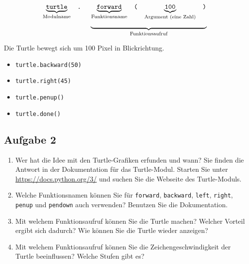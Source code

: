 $$
\begin{array}[t]{ccc} 
\underbrace{\textrm{\texttt{turtle}}}_{\textrm{Modulname}} & \texttt{.} & 
\begin{array}[t]{cccc} 
\underbrace{\textrm{\texttt{forward}}}_{\textrm{Funktionsname}} & \texttt{(} &\underbrace{\textrm{\texttt{100}}}_{\textrm{Argument (eine Zahl)}} & \texttt{)} \end{array} \\
 &  & \underbrace{\hspace{6cm}}_{\textrm{Funktionsaufruf}}
\end{array}
$$
\begin{center}
Die Turtle bewegt sich um \num{100} Pixel in Blickrichtung.
\end{center}
\vspace{0.5cm}
\begin{itemize}
	\centering
	\item[] \lstinline{turtle.backward(50)}
	\vspace{2.25cm}
	\item[] \lstinline{turtle.right(45)}
	\vspace{2.25cm}
	\item[] \lstinline{turtle.penup()}
	\vspace{2.25cm}
	\item[] \lstinline{turtle.done()}
	\vspace{2.25cm}
\end{itemize}

\subsection{Aufgabe 2}

\begin{enumerate}
	\item Wer hat die Idee mit den Turtle-Grafiken erfunden und wann? Sie finden die Antwort in der Dokumentation für das Turtle-Modul. Starten Sie unter \url{https://docs.python.org/3/} und suchen Sie die Webseite des Turtle-Moduls.
	\fillwithlines{0.5in}
	\item Welche Funktionsnamen können Sie für \lstinline{forward}, \lstinline{backward}, \lstinline{left}, \lstinline{right}, \lstinline{penup} und \lstinline{pendown} auch verwenden? Benutzen Sie die Dokumentation.
	\fillwithlines{0.5in}
	\item Mit welchem Funktionsaufruf können Sie die Turtle  machen? Welcher Vorteil ergibt sich dadurch? Wie können Sie die Turtle wieder anzeigen?
	\fillwithlines{0.75in}
	\item Mit welchem Funktionsaufruf können Sie die Zeichengeschwindigkeit der Turtle beeinflussen? Welche Stufen gibt es?
	\fillwithlines{0.75in}
\end{enumerate}

